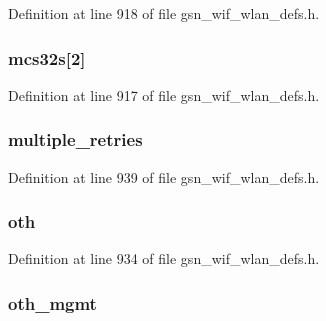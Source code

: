 Definition at line 918 of file gsn\_\-wif\_\-wlan\_\-defs.h.

\hypertarget{a00410_af6ac2ed83df90516d588a62afe6df20f}{
\subsubsection[{mcs32s}]{ {\bf mcs32s}\mbox{[}2\mbox{]}}}
\label{a00410_af6ac2ed83df90516d588a62afe6df20f}


Definition at line 917 of file gsn\_\-wif\_\-wlan\_\-defs.h.

\hypertarget{a00410_abb6b3759b3cebdf3620dfb03b50de2e0}{
\subsubsection[{multiple\_\-retries}]{ {\bf multiple\_\-retries}}}
\label{a00410_abb6b3759b3cebdf3620dfb03b50de2e0}


Definition at line 939 of file gsn\_\-wif\_\-wlan\_\-defs.h.

\hypertarget{a00410_aba1f71ef75513044ac20c228b28cb956}{
\subsubsection[{oth}]{ {\bf oth}}}
\label{a00410_aba1f71ef75513044ac20c228b28cb956}


Definition at line 934 of file gsn\_\-wif\_\-wlan\_\-defs.h.

\hypertarget{a00410_af35bbce45ee30e4b704726ff63da07ca}{
\subsubsection[{oth\_\-mgmt}]{ {\bf oth\_\-mgmt}}}
\label{a00410_af35bbce45ee30e4b704726ff63da07ca}


